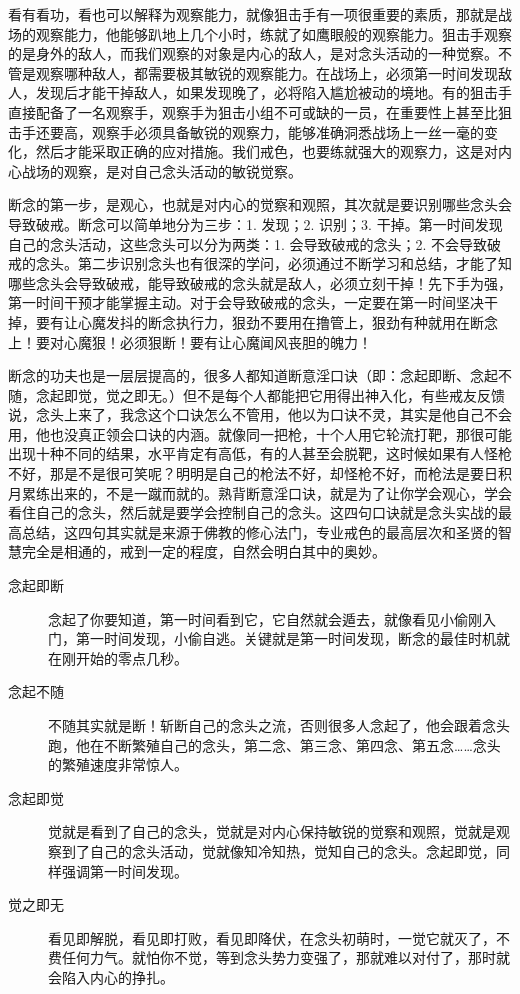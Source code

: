 看有看功，看也可以解释为观察能力，就像狙击手有一项很重要的素质，那就是战场的观察能力，他能够趴地上几个小时，练就了如鹰眼般的观察能力。狙击手观察的是身外的敌人，而我们观察的对象是内心的敌人，是对念头活动的一种觉察。不管是观察哪种敌人，都需要极其敏锐的观察能力。在战场上，必须第一时间发现敌人，发现后才能干掉敌人，如果发现晚了，必将陷入尴尬被动的境地。有的狙击手直接配备了一名观察手，观察手为狙击小组不可或缺的一员，在重要性上甚至比狙击手还要高，观察手必须具备敏锐的观察力，能够准确洞悉战场上一丝一毫的变化，然后才能采取正确的应对措施。我们戒色，也要练就强大的观察力，这是对内心战场的观察，是对自己念头活动的敏锐觉察。

断念的第一步，是观心，也就是对内心的觉察和观照，其次就是要识别哪些念头会导致破戒。断念可以简单地分为三步：1. 发现；2. 识别；3. 干掉。第一时间发现自己的念头活动，这些念头可以分为两类：1. 会导致破戒的念头；2. 不会导致破戒的念头。第二步识别念头也有很深的学问，必须通过不断学习和总结，才能了知哪些念头会导致破戒，能导致破戒的念头就是敌人，必须立刻干掉！先下手为强，第一时间干预才能掌握主动。对于会导致破戒的念头，一定要在第一时间坚决干掉，要有让心魔发抖的断念执行力，狠劲不要用在撸管上，狠劲有种就用在断念上！要对心魔狠！必须狠断！要有让心魔闻风丧胆的魄力！

断念的功夫也是一层层提高的，很多人都知道断意淫口诀（即：念起即断、念起不随，念起即觉，觉之即无。）但不是每个人都能把它用得出神入化，有些戒友反馈说，念头上来了，我念这个口诀怎么不管用，他以为口诀不灵，其实是他自己不会用，他也没真正领会口诀的内涵。就像同一把枪，十个人用它轮流打靶，那很可能出现十种不同的结果，水平肯定有高低，有的人甚至会脱靶，这时候如果有人怪枪不好，那是不是很可笑呢？明明是自己的枪法不好，却怪枪不好，而枪法是要日积月累练出来的，不是一蹴而就的。熟背断意淫口诀，就是为了让你学会观心，学会看住自己的念头，然后就是要学会控制自己的念头。这四句口诀就是念头实战的最高总结，这四句其实就是来源于佛教的修心法门，专业戒色的最高层次和圣贤的智慧完全是相通的，戒到一定的程度，自然会明白其中的奥妙。

\begin{description}
    \item[念起即断] 念起了你要知道，第一时间看到它，它自然就会遁去，就像看见小偷刚入门，第一时间发现，小偷自逃。关键就是第一时间发现，断念的最佳时机就在刚开始的零点几秒。
    \item[念起不随] 不随其实就是断！斩断自己的念头之流，否则很多人念起了，他会跟着念头跑，他在不断繁殖自己的念头，第二念、第三念、第四念、第五念……念头的繁殖速度非常惊人。
    \item[念起即觉] 觉就是看到了自己的念头，觉就是对内心保持敏锐的觉察和观照，觉就是观察到了自己的念头活动，觉就像知冷知热，觉知自己的念头。念起即觉，同样强调第一时间发现。
    \item[觉之即无] 看见即解脱，看见即打败，看见即降伏，在念头初萌时，一觉它就灭了，不费任何力气。就怕你不觉，等到念头势力变强了，那就难以对付了，那时就会陷入内心的挣扎。
\end{description}

